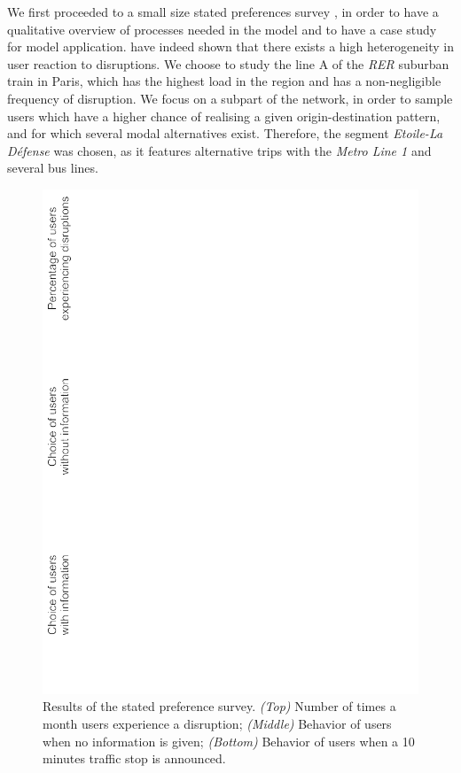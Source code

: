 \documentclass[3p,times,procedia]{elsarticle}
\begin{document}
We first proceeded to a small size stated preferences survey \citep{kroes1988stated}, in order to have a qualitative overview of processes needed in the model and to have a case study for model application. \cite{martin2016strategies} have indeed shown that there exists a high heterogeneity in user reaction to disruptions. We choose to study the line A of the \emph{RER} suburban train in Paris, which has the highest load in the region and has a non-negligible frequency of disruption. We focus on a subpart of the network, in order to sample users which have a higher chance of realising a given origin-destination pattern, and for which several modal alternatives exist. Therefore, the segment \emph{Etoile-La D{\'e}fense} was chosen, as it features alternative trips with the \emph{Metro Line 1} and several bus lines.


\begin{figure}%
\centerline{\includegraphics[width=\linewidth]{figures/Fig1.png}}
\caption{Results of the stated preference survey. \textit{(Top)} Number of times a month users experience a disruption; \textit{(Middle)} Behavior of users when no information is given; \textit{(Bottom)} Behavior of users when a 10 minutes traffic stop is announced.\label{fig:fig1}}
\end{figure}
\end{document}
